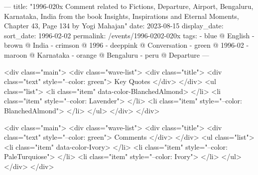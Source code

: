 ---
title: "1996-020x Comment related to Fictions, Departure, Airport, Bengaluru, Karnataka, India from the book Insights, Inspirations and Eternal Moments, Chapter 43, Page 134 by Yogi Mahajan"
date: 2023-08-15
display_date: 
sort_date: 1996-02-02
permalink: /events/1996-0202-020x
tags:
  - blue @ English
  - brown @ India
  - crimson @ 1996
  - deeppink @ Conversation
  - green @ 1996-02
  - maroon @ Karnataka
  - orange @ Bengaluru
  - peru @ Departure
---

<div class="main">
  <div class="wave-list">
    <div class="title">
      <div class="text" style="--color: green">
        Key Quotes
      </div>
    </div>
    <ul class="list">
        <li class="item" data-color-BlanchedAlmond>
        </li>
        <li class="item" style="--color: Lavender">
        </li>
        <li class="item" style="--color: BlanchedAlmond">
        </li>
      </ul>
  </div>
</div>

<div class="main">
  <div class="wave-list">
    <div class="title">
      <div class="text" style="--color: green">
        Comments
      </div>
    </div>
    <ul class="list">
        <li class="item" data-color-Ivory>
        </li>
        <li class="item" style="--color: PaleTurquiose">
        </li>
        <li class="item" style="--color: Ivory">
        </li>
      </ul>
  </div>
</div>